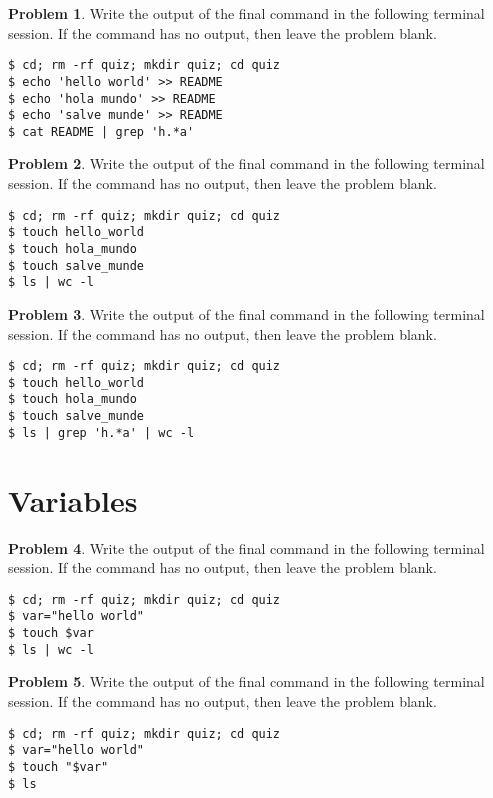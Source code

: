 \documentclass[10pt]{article}
\theoremstyle{definition}
\newtheorem{problem}{Problem}
\begin{document}
\filbreak\begin{problem}
    Write the output of the final command in the following terminal session.
    If the command has no output, then leave the problem blank.
\end{problem}
\begin{lstlisting}
$ cd; rm -rf quiz; mkdir quiz; cd quiz
$ echo 'hello world' >> README
$ echo 'hola mundo' >> README
$ echo 'salve munde' >> README
$ cat README | grep 'h.*a'
\end{lstlisting}
\vspace{0.4in}

\filbreak\begin{problem}
    Write the output of the final command in the following terminal session.
    If the command has no output, then leave the problem blank.
\end{problem}
\begin{lstlisting}
$ cd; rm -rf quiz; mkdir quiz; cd quiz
$ touch hello_world
$ touch hola_mundo
$ touch salve_munde
$ ls | wc -l
\end{lstlisting}
\vspace{0.4in}

\filbreak\begin{problem}
    Write the output of the final command in the following terminal session.
    If the command has no output, then leave the problem blank.
\end{problem}
\begin{lstlisting}
$ cd; rm -rf quiz; mkdir quiz; cd quiz
$ touch hello_world
$ touch hola_mundo
$ touch salve_munde
$ ls | grep 'h.*a' | wc -l
\end{lstlisting}
\vspace{0.4in}

\section{Variables}

\filbreak\begin{problem}
    Write the output of the final command in the following terminal session.
    If the command has no output, then leave the problem blank.
\end{problem}
\begin{lstlisting}
$ cd; rm -rf quiz; mkdir quiz; cd quiz
$ var="hello world"
$ touch $var
$ ls | wc -l
\end{lstlisting}
\vspace{0.4in}


\filbreak\begin{problem}
    Write the output of the final command in the following terminal session.
    If the command has no output, then leave the problem blank.
\end{problem}
\begin{lstlisting}
$ cd; rm -rf quiz; mkdir quiz; cd quiz
$ var="hello world"
$ touch "$var"
$ ls
\end{lstlisting}
\vspace{0.4in}
\end{document}

